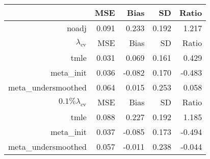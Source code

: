 \begin{tabular}{rrrrr}
  \hline
 & MSE & Bias & SD & Ratio \\
\hline
noadj & 0.091 & 0.233 & 0.192 & 1.217\\
  \hline
$\lambda_{\text{cv}}$ & MSE & Bias & SD & Ratio \\
\hline
tmle & 0.031 & 0.069 & 0.161 & 0.429\\
meta\_init & 0.036 & -0.082 & 0.170 & -0.483\\
meta\_undersmoothed & 0.064 & 0.015 & 0.253 & 0.058\\
  \hline
$0.1\% \lambda_{\text{cv}}$ & MSE & Bias & SD & Ratio \\
\hline
tmle & 0.088 & 0.227 & 0.192 & 1.185\\
meta\_init & 0.037 & -0.085 & 0.173 & -0.494\\
meta\_undersmoothed & 0.057 & -0.011 & 0.238 & -0.044\\
  \hline
\end{tabular}
